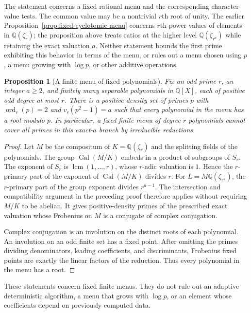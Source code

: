 \documentclass[11pt]{article}
\newcommand{\ord}{\operatorname{ord}}
\newtheorem{proposition}[theorem]{Proposition}
\theoremstyle{definition}
\theoremstyle{remark}
\begin{document}
The statement concerns a fixed rational menu and the corresponding
character-value tests.  The common value may be a nontrivial
$r$th root of unity.  The earlier
Proposition~\ref{prop:fixed-cyclotomic-menu} concerns $r$th-power
values of elements in $\mathbb Q(\zeta_r)$; the proposition
above treats ratios at the higher level $\mathbb Q(\zeta_{r^a})$
while retaining the exact valuation $a$.
Neither statement bounds the first prime exhibiting this behavior
in terms of the menu, or rules out a menu chosen using $p$,
a menu growing with $\log p$, or other additive operations.

\begin{proposition}[A finite menu of fixed polynomials]
\label{prop:fixed-polynomial-menu}
Fix an odd prime $r$, an integer $a\ge2$, and finitely many
separable polynomials in $\mathbb Q[X]$, each of positive odd
degree at most $r$.
There is a positive-density set of primes $p$ with
$\ord_r(p)=2$ and $v_r(p^2-1)=a$ such that every polynomial
in the menu has a root modulo $p$.
In particular, a fixed finite menu of degree-$r$ polynomials
cannot cover all primes in this exact-$a$ branch by irreducible
reductions.
\end{proposition}

\begin{proof}
Let $M$ be the compositum of $K=\mathbb Q(\zeta_r)$ and the
splitting fields of the polynomials.
The group $\operatorname{Gal}(M/K)$ embeds in a product of
subgroups of $S_r$. The exponent of $S_r$ is
$\operatorname{lcm}(1,\ldots,r)$, whose $r$-adic valuation is
$1$. Hence the $r$-primary part of the exponent of
$\operatorname{Gal}(M/K)$ divides $r$.
For $L=M\mathbb Q(\zeta_{r^a})$, the $r$-primary part of the
group exponent divides $r^{a-1}$.
The intersection and compatibility argument in the preceding
proof therefore applies without requiring $M/K$ to be abelian.
It gives positive-density primes of the prescribed exact
valuation whose Frobenius on $M$ is a conjugate of complex
conjugation.

Complex conjugation is an involution on the distinct roots of
each polynomial. An involution on an odd finite set has a fixed
point. After omitting the primes dividing denominators, leading
coefficients, and discriminants, Frobenius fixed points are
exactly the linear factors of the reduction.
Thus every polynomial in the menu has a root.
\end{proof}

These statements concern fixed finite menus. They do not rule out
an adaptive deterministic algorithm, a menu that grows with
$\log p$, or an element whose coefficients depend on previously
computed data.
\end{document}
